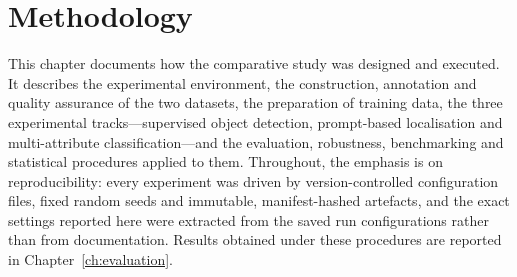 
\providecommand{\TBD}[1]{{\footnotesize\textbf{[TBD:\,#1]}}}

\chapter{Methodology}
\label{ch:methodology}

This chapter documents how the comparative study was designed and executed. It describes the experimental environment, the construction, annotation and quality assurance of the two datasets, the preparation of training data, the three experimental tracks---supervised object detection, prompt-based localisation and multi-attribute classification---and the evaluation, robustness, benchmarking and statistical procedures applied to them. Throughout, the emphasis is on reproducibility: every experiment was driven by version-controlled configuration files, fixed random seeds and immutable, manifest-hashed artefacts, and the exact settings reported here were extracted from the saved run configurations rather than from documentation. Results obtained under these procedures are reported in Chapter~\ref{ch:evaluation}.

